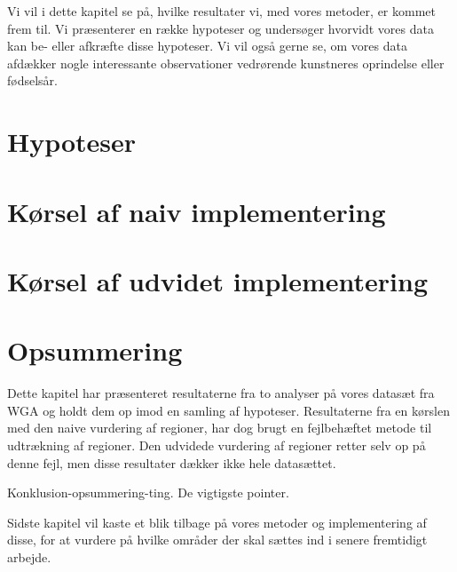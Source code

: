 {
{\sffamily Vi vil i dette kapitel se på, hvilke resultater vi, med vores
metoder, er kommet frem til. Vi præsenterer en række hypoteser og
undersøger hvorvidt vores data kan be- eller afkræfte disse hypoteser.
Vi vil også gerne se, om vores data afdækker nogle interessante
observationer vedrørende kunstneres oprindelse eller fødselsår.
}

\section{Hypoteser}


\section{Kørsel af naiv implementering\label{section_naiv_koersel}}

\clearpage


\clearpage

\section{Kørsel af udvidet implementering\label{section_udvidet_koersel}}


\section*{Opsummering}
Dette kapitel har præsenteret resultaterne fra to analyser på vores
datasæt fra WGA og holdt dem op imod en samling af hypoteser.
Resultaterne fra en kørslen med den naive vurdering af regioner, har dog
brugt en fejlbehæftet metode til udtrækning af regioner.  Den udvidede
vurdering af regioner retter selv op på denne fejl, men disse resultater
dækker ikke hele datasættet.

Konklusion-opsummering-ting. De vigtigste pointer.

Sidste kapitel vil kaste et blik tilbage på vores metoder og
implementering af disse, for at vurdere på hvilke områder der skal
sættes ind i senere fremtidigt arbejde.

}
